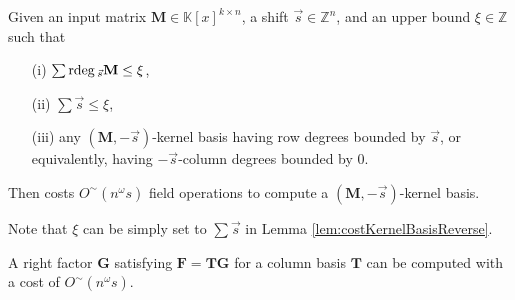 \begin{lem}
\label{lem:costKernelBasisReverse}Given an input matrix $\mathbf{M}\in\mathbb{K}\left[x\right]^{k\times n}$,
a shift $\vec{s}\in\mathbb{Z}^{n}$, and an upper bound $\xi\in\mathbb{Z}$
such that 
\begin{itemize}
\item[(i)] $\sum{\rm rdeg}\,_{\vec{s}}\mathbf{M}\le\xi$,
\item[(ii)] $\sum\vec{s}\le\xi$,
\item[(iii)] any $\left(\mathbf{M},-\vec{s}\right)$-kernel basis having row
degrees bounded by $\vec{s}$, or equivalently, having $-\vec{s}$-column
degrees bounded by 0.
\end{itemize}
Then  costs $O^{\sim}\left(n^{\omega}s\right)$
field operations to compute a $\left(\mathbf{M},-\vec{s}\right)$-kernel
basis.
\end{lem}
Note that $\xi$ can be simply set to $\sum\vec{s}$ in Lemma \ref{lem:costKernelBasisReverse}.
\begin{thm}
A right factor $\mathbf{G}$ satisfying $\mathbf{F}=\mathbf{TG}$
for a column basis $\mathbf{T}$ can be computed with a cost of $O^{\sim}\left(n^{\omega}s\right)$. \end{thm}

